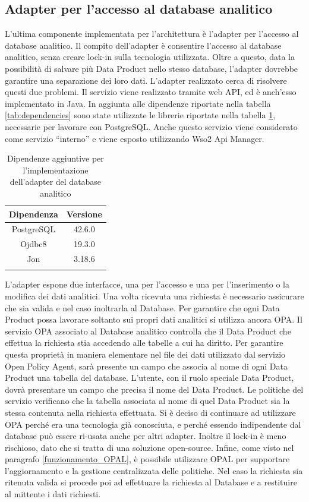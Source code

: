 \documentclass[12pt]{report}
\begin{document}
\subsection{Adapter per l'accesso al database analitico}
L'ultima componente implementata per l'architettura è l'adapter per l'accesso al database analitico.
Il compito dell'adapter è consentire l'accesso al database analitico, senza creare lock-in sulla tecnologia utilizzata.
Oltre a questo, data la possibilità di salvare più Data Product nello stesso database, l'adapter dovrebbe garantire una separazione dei loro dati.
L'adapter realizzato cerca di risolvere questi due problemi.
Il servizio viene realizzato tramite web API, ed è anch'esso implementato in Java.
In aggiunta alle dipendenze riportate nella tabella \ref{tab:dependencies} sono state utilizzate le librerie riportate nella tabella \ref{tab:dependencies2}, necessarie per lavorare con PostgreSQL.
Anche questo servizio viene considerato come servizio ``interno'' e viene esposto utilizzando Wso2 Api Manager.
\begin{table}
    \centering
    \begin{tabular}{|c|c|}
        \hline
        Dipendenza & Versione \\
        \hline
        PostgreSQL & 42.6.0 \\
        Ojdbc8 & 19.3.0 \\
        Jon & 3.18.6 \\
        \hline
        \label{tab:dependencies2}
        \caption{Dipendenze aggiuntive per l'implementazione dell'adapter del database analitico}
    \end{tabular}
\end{table}
L'adapter espone due interfacce, una per l'accesso e una per l'inserimento o la modifica dei dati analitici.
Una volta ricevuta una richiesta è necessario assicurare che sia valida e nel caso inoltrarla al Database.
Per garantire che ogni Data Product possa lavorare soltanto sui propri dati analitici si utilizza ancora OPA.
Il servizio OPA associato al Database analitico controlla che il Data Product che effettua la richiesta stia accedendo alle tabelle a cui ha diritto.
Per garantire questa proprietà in maniera elementare nel file dei dati utilizzato dal servizio Open Policy Agent, sarà presente un campo che associa al nome di ogni Data Product una tabella del database.
L'utente, con il ruolo speciale Data Product, dovrà presentare un campo che precisa il nome del Data Product.
Le politiche del servizio verificano che la tabella associata al nome di quel Data Product sia la stessa contenuta nella richiesta effettuata.
Si è deciso di continuare ad utilizzare OPA perché era una tecnologia già conosciuta, e perché essendo indipendente dal database può essere ri-usata anche per altri adapter.
Inoltre il lock-in è meno rischioso, dato che si tratta di una soluzione open-source. 
Infine, come visto nel paragrafo \ref{funzionamento_OPAL}, è possibile utilizzare OPAL per supportare l'aggiornamento e la gestione centralizzata delle politiche.
Nel caso la richiesta sia ritenuta valida si procede poi ad effettuare la richiesta al Database e a restituire al mittente i dati richiesti.
\end{document}
